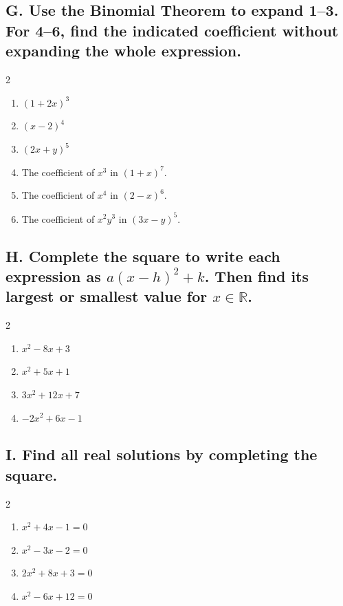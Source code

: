 \documentclass{article}
\newcommand{\R}{\mathbb{R}}
\begin{document}
\subsection*{G. Use the Binomial Theorem to expand 1--3. For 4--6, find the indicated coefficient without expanding the whole expression.}
\begin{multicols}{2}
\begin{enumerate}
    \item $(1+2x)^3$
    \item $(x-2)^4$
    \item $(2x+y)^5$
    \item The coefficient of $x^3$ in $(1+x)^7$.
    \item The coefficient of $x^4$ in $(2-x)^6$.
    \item The coefficient of $x^2y^3$ in $(3x-y)^5$.
\end{enumerate}
\end{multicols}

\subsection*{H. Complete the square to write each expression as $a(x-h)^2+k$. Then find its largest or smallest value for $x\in\R$.}
\begin{multicols}{2}
\begin{enumerate}
    \item $x^2-8x+3$
    \item $x^2+5x+1$
    \item $3x^2+12x+7$
    \item $-2x^2+6x-1$
\end{enumerate}
\end{multicols}

\subsection*{I. Find all real solutions by completing the square.}
\begin{multicols}{2}
\begin{enumerate}
    \item $x^2+4x-1=0$
    \item $x^2-3x-2=0$
    \item $2x^2+8x+3=0$
    \item $x^2-6x+12=0$
\end{enumerate}
\end{multicols}
\end{document}
